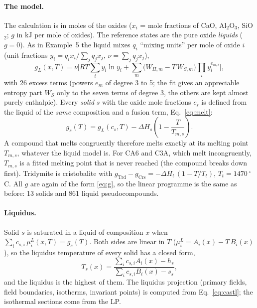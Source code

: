 \documentclass[11pt,a4paper]{article}
\begin{document}
\paragraph{The model.} The calculation is in moles of the oxides ($x_i$ = mole fractions of CaO, Al$_2$O$_3$,
SiO$_2$; $g$ in kJ per mole of oxides). The reference states are the pure oxide \emph{liquids} ($g = 0$). As in
Example~5 the liquid mixes $q_i$ ``mixing units'' per mole of oxide $i$ (unit fractions
$y_i = q_i x_i/\sum_j q_j x_j$, $\nu = \sum_j q_j x_j$),
\begin{equation}\label{eq:casliq}
  g_L(x, T) = \nu\Big[RT\sum_i y_i\ln y_i + \sum_m \big(W_{H,m} - T\,W_{S,m}\big)\prod_i y_i^{e_{m,i}}\Big],
\end{equation}
with 26 excess terms (powers $e_m$ of degree 3 to 5; the fit gives an appreciable entropy part $W_S$ only to the
seven terms of degree 3, the others are kept almost purely enthalpic).
Every \emph{solid} $s$ with the oxide mole fractions $c_s$ is defined from the liquid of the \emph{same}
composition and a fusion term, Eq.~\eqref{eq:melt}:
\begin{equation}\label{eq:cassol}
  g_s(T) = g_L(c_s, T) - \Delta H_s\left(1 - \frac{T}{T_{m,s}}\right).
\end{equation}
A compound that melts congruently therefore melts exactly at its melting point $T_{m,s}$, whatever the liquid
model is. For CA6 and C3A, which melt incongruently, $T_{m,s}$ is a fitted melting point that is never
reached (the compound breaks down first). Tridymite is cristobalite with
$g_\mathrm{Trd} - g_\mathrm{Crs} = -\Delta H_t\,(1 - T/T_t)$, $T_t = 1470\,^\circ$C. All $g$ are again of the
form \eqref{eq:g}, so the linear programme is the same as before: 13 solids and 861 liquid pseudocompounds.

\paragraph{Liquidus.} Solid $s$ is saturated in a liquid of composition $x$ when
$\sum_i c_{s,i}\,\mu_i^L(x, T) = g_s(T)$. Both sides are linear in $T$ ($\mu_i^L = A_i(x) - T\,B_i(x)$), so the
liquidus temperature of every solid has a closed form,
\begin{equation}\label{eq:castl}
  T_s(x) = \frac{\sum_i c_{s,i} A_i(x) - h_s}{\sum_i c_{s,i} B_i(x) - s_s},
\end{equation}
and the liquidus is the highest of them. The liquidus projection (primary fields, field boundaries, isotherms,
invariant points) is computed from Eq.~\eqref{eq:castl}; the isothermal sections come from the LP.
\end{document}

